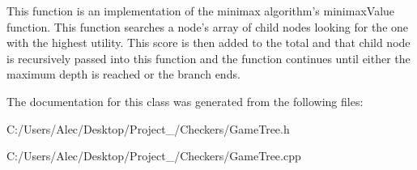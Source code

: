 This function is an implementation of the minimax algorithm's minimax\-Value function. This function searches a node's array of child nodes looking for the one with the highest utility. This score is then added to the total and that child node is recursively passed into this function and the function continues until either the maximum depth is reached or the branch ends.

The documentation for this class was generated from the following files\-:\begin{DoxyCompactItemize}
\item 
C\-:/\-Users/\-Alec/\-Desktop/\-Project\-\_/\-Checkers/Game\-Tree.\-h\item 
C\-:/\-Users/\-Alec/\-Desktop/\-Project\-\_/\-Checkers/Game\-Tree.\-cpp\end{DoxyCompactItemize}
